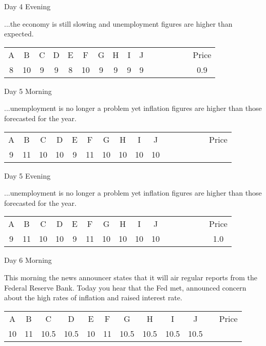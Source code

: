 \documentclass[notes=show]{beamer}
\begin{document}
\begin{frame}{Day 4 Evening}

\qquad ...the economy is still slowing and unemployment figures are
higher than expected.

\bigskip

\begin{center}
\begin{tabular}{cccccccccccccccc}
A & B & C & D & E & F & G & H & I & J &  &  &  &  &  & Price \\ 
8 & 10 & 9 & 9 & 8 & 10 & 9 & 9 & 9 & 9 &  &  &  &  &  & 0.9%
\end{tabular}
\end{center}
\end{frame}%


\begin{frame}{Day 5 Morning}

\qquad ...unemployment is no longer a problem yet inflation
figures are higher than those forecasted for the year.

\bigskip

\begin{center}
\begin{tabular}{cccccccccccccccc}
A & B & C & D & E & F & G & H & I & J &  &  &  &  &  & Price \\ 
9 & 11 & 10 & 10 & 9 & 11 & 10 & 10 & 10 & 10 &  &  &  &  &  & 
\end{tabular}
\end{center}
\end{frame}

\begin{frame}{Day 5 Evening}

\qquad ...unemployment is no longer a problem yet inflation
figures are higher than those forecasted for the year.

\bigskip

\begin{center}
\begin{tabular}{cccccccccccccccc}
A & B & C & D & E & F & G & H & I & J &  &  &  &  &  & Price \\ 
9 & 11 & 10 & 10 & 9 & 11 & 10 & 10 & 10 & 10 &  &  &  &  &  & 1.0%
\end{tabular}
\end{center}
\end{frame}%


\begin{frame}{Day 6 Morning}

\qquad This morning the news announcer states that it will air
regular reports from the Federal Reserve Bank. Today you hear that the Fed
met, announced concern about the high rates of inflation and raised interest
rate.

\bigskip

\begin{center}
\begin{tabular}{cccccccccccc}
A & B & C & D & E & F & G & H & I & J &  & Price \\ 
10 & 11 & 10.5 & 10.5 & 10 & 11 & 10.5 & 10.5 & 10.5 & 10.5 &  & 
\end{tabular}
\end{center}
\end{frame}
\end{document}
